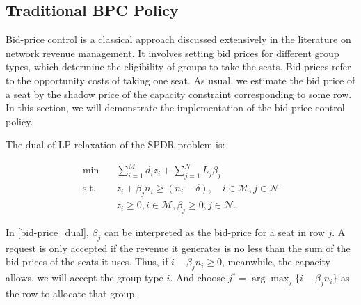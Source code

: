 


\subsection{Traditional BPC Policy}
Bid-price control is a classical approach discussed extensively in the literature on network revenue management. It involves setting bid prices for different group types, which determine the eligibility of groups to take the seats. Bid-prices refer to the opportunity costs of taking one seat. As usual, we estimate the bid price of a seat by the shadow price of the capacity constraint corresponding to some row. In this section, we will demonstrate the implementation of the bid-price control policy. 

The dual of LP relaxation of the SPDR problem is:

\begin{equation}\label{bid-price_dual}
    \begin{aligned}
    \min \quad & \sum_{i=1}^{M} d_i z_i + \sum_{j= 1}^{N} L_j \beta_{j} \\
    \text {s.t.} \quad & z_{i} + \beta_j n_i \geq (n_i-\delta), \quad i \in \mathcal{M}, j \in \mathcal{N} \\
    & z_{i} \geq 0, i \in \mathcal{M}, \beta_{j} \geq 0, j \in \mathcal{N}.
    \end{aligned}
  \end{equation}

In \eqref{bid-price_dual}, $\beta_{j}$ can be interpreted as the bid-price for a seat in row $j$. A request is only accepted if the revenue it generates is no less than the sum of the bid prices of the seats it uses. Thus, if $i -\beta_{j} n_i \geq 0$, meanwhile, the capacity allows, we will accept the group type $i$. And choose $j^{*} = \arg \max_{j} \{i -\beta_{j} n_i\}$ as the row to allocate that group.
  
